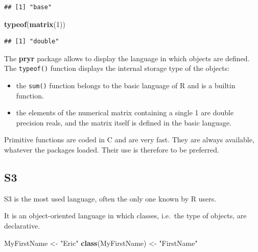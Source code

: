 \documentclass[
  12pt,
  american,
  a4paper,
  extrafontsizes,onecolumn,openright
  ]{memoir}
\newenvironment{Shaded}{\begin{snugshade}}{\end{snugshade}}
\newcommand{\DecValTok}[1]{\textcolor[rgb]{0.00,0.00,0.81}{#1}}
\newcommand{\FunctionTok}[1]{\textcolor[rgb]{0.13,0.29,0.53}{\textbf{#1}}}
\newcommand{\NormalTok}[1]{#1}
\newcommand{\OtherTok}[1]{\textcolor[rgb]{0.56,0.35,0.01}{#1}}
\newcommand{\StringTok}[1]{\textcolor[rgb]{0.31,0.60,0.02}{#1}}
\providecommand{\tightlist}{%
  \setlength{\itemsep}{0pt}\setlength{\parskip}{0pt}}
\begin{document}
\begin{verbatim}
## [1] "base"
\end{verbatim}

\begin{Shaded}
\begin{Highlighting}[]
\FunctionTok{typeof}\NormalTok{(}\FunctionTok{matrix}\NormalTok{(}\DecValTok{1}\NormalTok{))}
\end{Highlighting}
\end{Shaded}

\begin{verbatim}
## [1] "double"
\end{verbatim}

\normalsize

The \textbf{pryr} package allows to display the language in which objects are defined.
The \texttt{typeof()} function displays the internal storage type of the objects:

\begin{itemize}
\tightlist
\item
  the \texttt{sum()} function belongs to the basic language of R and is a builtin function.
\item
  the elements of the numerical matrix containing a single 1 are double precision reals, and the matrix itself is defined in the basic language.
\end{itemize}

Primitive functions are coded in C and are very fast.
They are always available, whatever the packages loaded.
Their use is therefore to be preferred.

\subsection{S3}\label{sec:S3}

S3 is the most used language, often the only one known by R users.

It is an object-oriented language in which classes, i.e.~the type of objects, are declarative.

\scriptsize

\begin{Shaded}
\begin{Highlighting}[]
\NormalTok{MyFirstName }\OtherTok{\textless{}{-}} \StringTok{"Eric"}
\FunctionTok{class}\NormalTok{(MyFirstName) }\OtherTok{\textless{}{-}} \StringTok{"FirstName"}
\end{Highlighting}
\end{Shaded}
\end{document}
